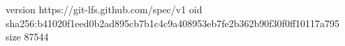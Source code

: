 version https://git-lfs.github.com/spec/v1
oid sha256:b41020f1eed0b2ad895cb7b1c4c9a408953eb7fe2b362b90f30f0ff10117a795
size 87544

